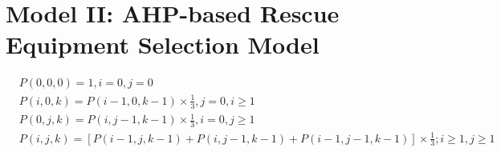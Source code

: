 \section{Model II: AHP-based Rescue Equipment Selection Model}

\[
	\begin{aligned}
		 & P(0,0,0)=1, i=0, j=0                                                                                \\
		 & P(i, 0, k)=P(i-1,0, k-1) \times \frac{1}{3}, j=0, i \geq 1                                          \\
		 & P(0, j, k)=P(i, j-1, k-1) \times \frac{1}{3}, i=0, j \geq 1                                         \\
		 & P(i, j, k)=[P(i-1, j, k-1)+P(i, j-1, k-1)+P(i-1, j-1, k-1)] \times \frac{1}{3} ; i \geq 1, j \geq 1
	\end{aligned}
\]
